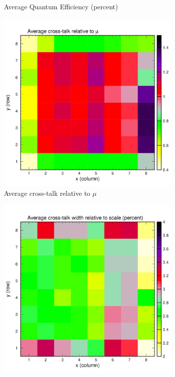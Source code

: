 \begin{figure}[b]
\begin{subfigure}[c]{0.4\linewidth}
		\caption{Average Quantum Efficiency (percent)}
		\vspace{0mm}
	\end{subfigure}%
	\vspace{3mm}
	\begin{subfigure}[c]{0.4\linewidth}
		\centering
		\includegraphics[width=\linewidth, trim={0mm 0mm 0mm 19mm},clip]{figures/pglobal_beta.pdf}
		\caption{Average cross-talk relative to $\mu$}
		\vspace{0mm}
	\end{subfigure}%
	\begin{subfigure}[c]{0.4\linewidth}
		\centering
		\includegraphics[width=\linewidth, trim={0mm 0mm 0mm 19mm},clip]{figures/pglobal_zeta.pdf}

\end{subfigure}
\end{figure}
